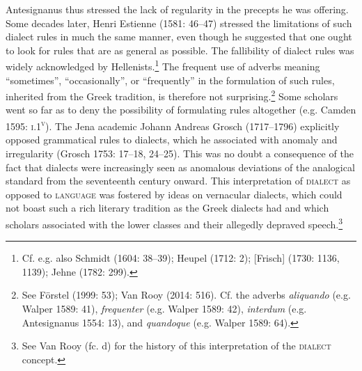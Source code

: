 \documentclass[12pt]{article}
\newenvironment{styleStandard}{\renewcommand\baselinestretch{1.25}\setlength\leftskip{0in}\setlength\rightskip{0in}\setlength\parindent{0.1972in}\setlength\parfillskip{0pt plus 1fil}\setlength\parskip{0in plus 1pt}\writerlistparindent\writerlistleftskip\leavevmode\normalfont\normalsize\writerlistlabel\ignorespaces}{\unskip\vspace{0in plus 1pt}\par}
\newcommand\writerlistleftskip{}
\newcommand\writerlistparindent{}
\newcommand\writerlistlabel{}
\begin{document}
\begin{styleStandard}
Antesignanus thus stressed the lack of regularity in the precepts he was offering. Some decades later, Henri Estienne (1581: 46–47) stressed the limitations of such dialect rules in much the same manner, even though he suggested that one ought to look for rules that are as general as possible. The fallibility of dialect rules was widely acknowledged by Hellenists.\footnote{\textrm{ Cf. e.g. also Schmidt (1604: 38–39); Heupel (1712: 2); [Frisch] (1730: 1136, 1139); Jehne (1782: 299).}} The frequent use of adverbs meaning “sometimes”, “occasionally”, or “frequently” in the formulation of such rules, inherited from the Greek tradition, is therefore not surprising.\footnote{\textrm{ See Förstel (1999: 53); Van Rooy (2014: 516). Cf. the adverbs }\textrm{\textit{aliquando}}\textrm{ (e.g. Walper 1589: 41), }\textrm{\textit{frequenter}}\textrm{ (e.g. Walper 1589: 42), }\textrm{\textit{interdum}}\textrm{ (e.g. Antesignanus 1554: 13),}\textrm{\textit{ }}\textrm{and }\textrm{\textit{quandoque}}\textrm{ (e.g. Walper 1589: 64).}} Some scholars went so far as to deny the possibility of formulating rules altogether (e.g. Camden 1595: \textsc{i}.1\textsc{\textsuperscript{v}}). The Jena academic Johann Andreas Grosch (1717–1796) explicitly opposed grammatical rules to dialects, which he associated with anomaly and irregularity (Grosch 1753: 17–18, 24–25). This was no doubt a consequence of the fact that dialects were increasingly seen as anomalous deviations of the analogical standard from the seventeenth century onward. This interpretation of \textsc{dialect }as opposed to \textsc{language }was fostered by ideas on vernacular dialects, which could not boast such a rich literary tradition as the Greek dialects had and which scholars associated with the lower classes and their allegedly depraved speech.\footnote{\textrm{ See Van Rooy (fc. d) for the history of this interpretation of the }\textrm{\textsc{dialect}}\textrm{ concept.}}
\end{styleStandard}
\end{document}
